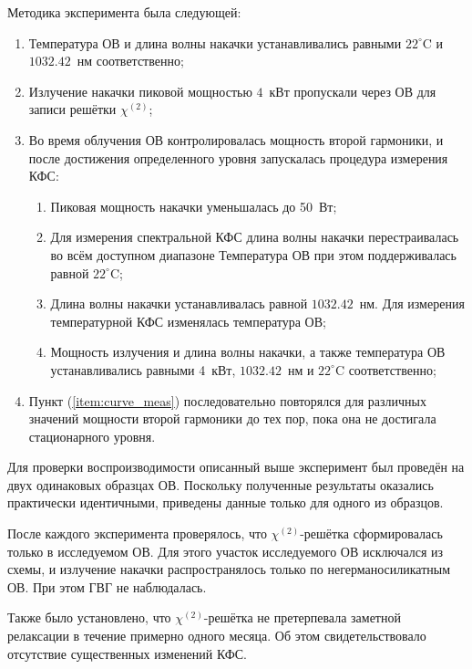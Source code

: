 Методика эксперимента была следующей:

\begin{enumerate}
	\item Температура ОВ и длина волны накачки устанавливались равными  $22^{\circ}$C и $1032.42$~нм соответственно;
	\item Излучение накачки пиковой мощностью \(4\)~кВт пропускали через ОВ для записи решётки \(\chi^{(2)}\);
	\item \label{item:curve_meas} Во время облучения ОВ контролировалась мощность второй гармоники, и после достижения определенного уровня запускалась процедура измерения КФС:
	\begin{enumerate}
		\item Пиковая мощность накачки уменьшалась до 50~Вт;
		\item Для измерения спектральной КФС длина волны накачки перестраивалась во всём доступном диапазоне Температура ОВ при этом поддерживалась равной $22^{\circ}$C;
		\item \label{item:temperature_tuning_curve} Длина волны накачки устанавливалась равной $1032.42$~нм. Для измерения температурной КФС изменялась температура ОВ;
		\item \label{item:pump_power_increase} Мощность излучения и длина волны накачки, а также температура ОВ устанавливались равными 4~кВт, $1032.42$~нм и $22^{\circ}$C соответственно;
	\end{enumerate}
	\item Пункт (\ref{item:curve_meas}) последовательно повторялся для различных значений мощности второй гармоники до тех пор, пока она не достигала стационарного уровня.
\end{enumerate}

Для проверки воспроизводимости описанный выше эксперимент был проведён на двух одинаковых образцах ОВ. Поскольку полученные результаты оказались практически идентичными, приведены данные только для одного из образцов.

После каждого эксперимента проверялось, что \(\chi^{(2)}\)-решётка сформировалась только в исследуемом ОВ. Для этого участок исследуемого ОВ исключался из схемы, и излучение накачки распространялось только по негерманосиликатным ОВ. При этом ГВГ не наблюдалась.

Также было установлено, что \(\chi^{(2)}\)-решётка не претерпевала заметной релаксации в течение примерно одного месяца. Об этом свидетельствовало отсутствие существенных изменений КФС.


\clearpage

